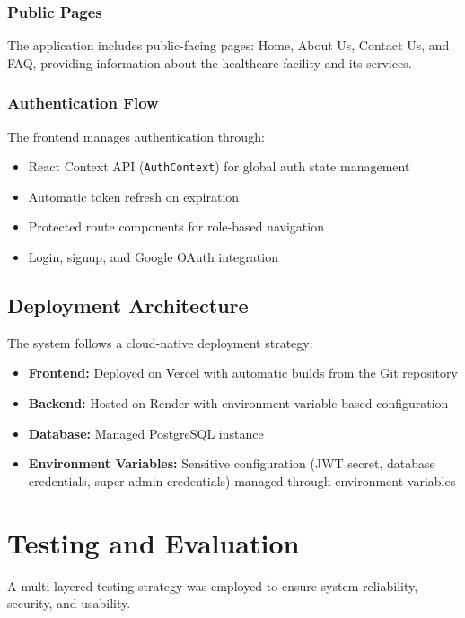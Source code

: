 \documentclass[conference]{IEEEtran}
\begin{document}
\subsubsection{Public Pages}
The application includes public-facing pages: Home, About Us, Contact Us, and FAQ, providing information about the healthcare facility and its services.

\subsubsection{Authentication Flow}
The frontend manages authentication through:
\begin{itemize}[leftmargin=*]
  \item React Context API (\texttt{AuthContext}) for global auth state management
  \item Automatic token refresh on expiration
  \item Protected route components for role-based navigation
  \item Login, signup, and Google OAuth integration
\end{itemize}

\subsection{Deployment Architecture}
The system follows a cloud-native deployment strategy:
\begin{itemize}[leftmargin=*]
  \item \textbf{Frontend:} Deployed on Vercel with automatic builds from the Git repository
  \item \textbf{Backend:} Hosted on Render with environment-variable-based configuration
  \item \textbf{Database:} Managed PostgreSQL instance
  \item \textbf{Environment Variables:} Sensitive configuration (JWT secret, database credentials, super admin credentials) managed through environment variables
\end{itemize}

\section{Testing and Evaluation}

A multi-layered testing strategy was employed to ensure system reliability, security, and usability.
\end{document}
